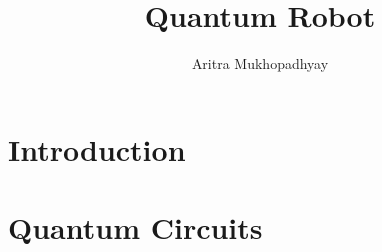 \documentclass[12pt]{article}
\title{Quantum Robot}
\author{Aritra Mukhopadhyay}
\date{} %
\begin{document}
    

	

    \pagebreak
    \tableofcontents
    
	\pagebreak %
    \section{Introduction}
    
    
    \section{Quantum Circuits}
    
    
    
    
    
    
    \pagebreak %
    
    
\end{document}
